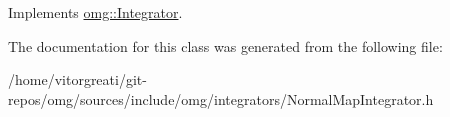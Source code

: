 Implements \mbox{\hyperlink{classomg_1_1_integrator_a2922583794310f6b1ff8ee121666f7a1}{omg\+::\+Integrator}}.



The documentation for this class was generated from the following file\+:\begin{DoxyCompactItemize}
\item 
/home/vitorgreati/git-\/repos/omg/sources/include/omg/integrators/Normal\+Map\+Integrator.\+h\end{DoxyCompactItemize}
